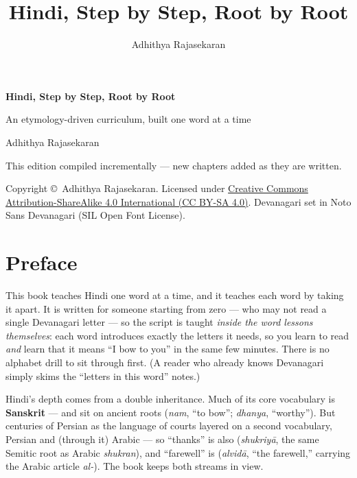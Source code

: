 \documentclass[11pt,twoside]{book}
\title{\Huge Hindi, Step by Step, Root by Root}
\author{Adhithya Rajasekaran}
\date{}
\begin{document}
\frontmatter

\begin{titlepage}
  \centering
  \vspace*{3cm}
  {\Huge\bfseries Hindi, Step by Step, Root by Root\par}
  \vspace{1cm}
  {\Large An etymology-driven curriculum, built one word at a time\par}
  \vspace{1.5cm}
  {\large Adhithya Rajasekaran\par}
  \vfill
  {\large This edition compiled incrementally --- new chapters added as they
  are written.\par}
  \vspace{2cm}
  {\normalsize
    Copyright \copyright\ Adhithya Rajasekaran. Licensed under
    \href{https://creativecommons.org/licenses/by-sa/4.0/}%
    {Creative Commons Attribution-ShareAlike 4.0 International (CC BY-SA 4.0)}.
    Devanagari set in Noto Sans Devanagari (SIL Open Font License).\par
  }
\end{titlepage}

\chapter*{Preface}

This book teaches Hindi one word at a time, and it teaches each word by taking
it apart. It is written for someone starting from zero --- who may not
read a single Devanagari letter --- so the script is taught \emph{inside the
word lessons themselves}: each word introduces exactly the letters it needs,
so you learn to read  \emph{and} learn that it means ``I bow to
you'' in the same few minutes. There is no alphabet drill to sit through
first. (A reader who already knows Devanagari simply skims the ``letters in
this word'' notes.)

Hindi's depth comes from a double inheritance. Much of its core vocabulary is
\textbf{Sanskrit} ---  and  sit on ancient roots
(\emph{nam}, ``to bow''; \emph{dhanya}, ``worthy''). But centuries of Persian
as the language of courts layered on a second vocabulary, Persian and (through
it) Arabic --- so ``thanks'' is also  (\emph{shukriyā}, the same
Semitic root as Arabic \emph{shukran}), and ``farewell'' is 
(\emph{alvidā}, ``the farewell,'' carrying the Arabic article \emph{al-}). The
book keeps both streams in view.
\end{document}
